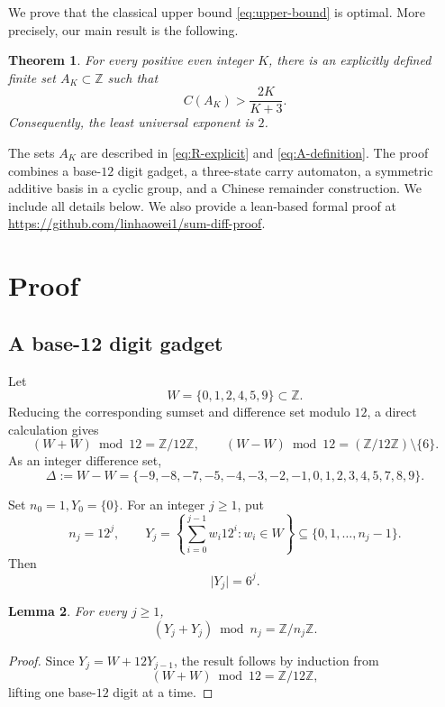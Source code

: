 \documentclass[11pt,reqno]{amsart}
\theoremstyle{plain}
\newtheorem{theorem}{Theorem}[section]
\newtheorem{lemma}[theorem]{Lemma}
\theoremstyle{definition}
\theoremstyle{remark}
\theoremstyle{named}
\newcommand{\Z}{\mathbb Z}
\newcommand{\card}[1]{\lvert #1\rvert}
\begin{document}
We prove that the classical upper bound \eqref{eq:upper-bound} is optimal.  
More precisely, our main result is the following.

\begin{theorem}\label{thm:main}
For every positive even integer $K$, there is an explicitly defined finite set
$A_K\subset\Z$ such that
\[
 C(A_K)>\frac{2K}{K+3}.
\]
Consequently, the least universal exponent is $2$.
\end{theorem}

The sets $A_K$ are described in \eqref{eq:R-explicit} and \eqref{eq:A-definition}. 
The proof combines a base-$12$ digit gadget, a three-state carry automaton, a symmetric additive basis in a cyclic group, and a Chinese remainder construction. 
We include all details below. We also provide a lean-based formal proof at \url{https://github.com/linhaowei1/sum-diff-proof}.

\section{Proof}\label{sec:proof}

\subsection{A base-12 digit gadget}

Let
\[
 W=\{0,1,2,4,5,9\}\subset\Z.
\]
Reducing the corresponding sumset and difference set modulo $12$, a direct
calculation gives
\begin{equation}\label{eq:seed}
 (W+W)\bmod 12=\Z/12\Z,
 \qquad
 (W-W)\bmod 12=(\Z/12\Z)\setminus\{6\}.
\end{equation}
As an integer difference set,
\[
 \Delta:=W-W
 =\{-9,-8,-7,-5,-4,-3,-2,-1,0,1,2,3,4,5,7,8,9\}.
\]

Set $n_0=1, Y_0=\{0\}$. For an integer $j\ge1$, put
\[
 n_j=12^j,
 \qquad
 Y_j=
 \left\{
   \sum_{i=0}^{j-1}w_i12^i:w_i\in W
 \right\}
 \subseteq\{0,1,\ldots,n_j-1\}.
\]
Then
\begin{equation}\label{eq:Ysize}
 \card{Y_j}=6^j.
\end{equation}

\begin{lemma}\label{lem:full-sum}
For every $j\ge1$,
\[
 (Y_j+Y_j)\bmod n_j=\Z/n_j\Z.
\]
\end{lemma}

\begin{proof}
Since \(Y_j=W+12Y_{j-1}\), the result follows by induction from
\[
(W+W)\bmod 12=\mathbb Z/12\mathbb Z,
\]
lifting one base-\(12\) digit at a time.
\end{proof}
\end{document}

